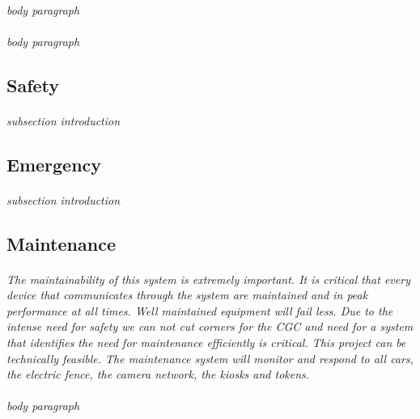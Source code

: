 \documentclass[12pt]{article}
\begin{document}
	\paragraph{} \textit{body paragraph}
	\paragraph{} \textit{body paragraph}
	
	\subsection{Safety}
	\paragraph{} \textit{subsection introduction}
	\paragraph{}

	\subsection{Emergency}
	\paragraph{} \textit{subsection introduction}
	
	\subsection{Maintenance}
	\paragraph{} \textit{The maintainability of this system is extremely important. 
	It is critical that every device that communicates through the system are maintained 
	and in peak performance at all times. Well maintained equipment will fail less. Due to 
	the intense need for safety we can not cut corners for the CGC and need for a system 
	that identifies the need for maintenance efficiently is critical. This project can 
	be technically feasible. The maintenance system will monitor and respond to all cars, 
	the electric fence, the camera network, the kiosks and tokens.}
	
	\paragraph{} \textit{body paragraph}
\end{document}
